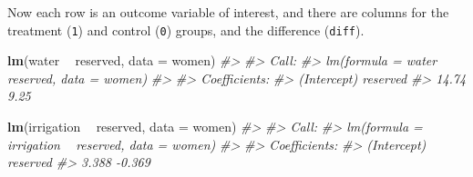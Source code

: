 \documentclass[]{book}
\newenvironment{Shaded}{\begin{snugshade}}{\end{snugshade}}
\newcommand{\CommentTok}[1]{\textcolor[rgb]{0.56,0.35,0.01}{\textit{#1}}}
\newcommand{\DataTypeTok}[1]{\textcolor[rgb]{0.13,0.29,0.53}{#1}}
\newcommand{\KeywordTok}[1]{\textcolor[rgb]{0.13,0.29,0.53}{\textbf{#1}}}
\newcommand{\NormalTok}[1]{#1}
\newcommand{\OperatorTok}[1]{\textcolor[rgb]{0.81,0.36,0.00}{\textbf{#1}}}
\newcommand{\StringTok}[1]{\textcolor[rgb]{0.31,0.60,0.02}{#1}}
\theoremstyle{definition}
\theoremstyle{definition}
\theoremstyle{definition}
\theoremstyle{remark}
\begin{document}
\begin{Shaded}
\end{Shaded}

Now each row is an outcome variable of interest, and there are columns
for the treatment (\texttt{1}) and control (\texttt{0}) groups, and the
difference (\texttt{diff}).

\begin{Shaded}
\begin{Highlighting}[]
\KeywordTok{lm}\NormalTok{(water }\OperatorTok{~}\StringTok{ }\NormalTok{reserved, }\DataTypeTok{data =}\NormalTok{ women)}
\CommentTok{#> }
\CommentTok{#> Call:}
\CommentTok{#> lm(formula = water ~ reserved, data = women)}
\CommentTok{#> }
\CommentTok{#> Coefficients:}
\CommentTok{#> (Intercept)     reserved  }
\CommentTok{#>       14.74         9.25}
\end{Highlighting}
\end{Shaded}

\begin{Shaded}
\begin{Highlighting}[]
\KeywordTok{lm}\NormalTok{(irrigation }\OperatorTok{~}\StringTok{ }\NormalTok{reserved, }\DataTypeTok{data =}\NormalTok{ women)}
\CommentTok{#> }
\CommentTok{#> Call:}
\CommentTok{#> lm(formula = irrigation ~ reserved, data = women)}
\CommentTok{#> }
\CommentTok{#> Coefficients:}
\CommentTok{#> (Intercept)     reserved  }
\CommentTok{#>       3.388       -0.369}
\end{Highlighting}
\end{Shaded}
\end{document}
